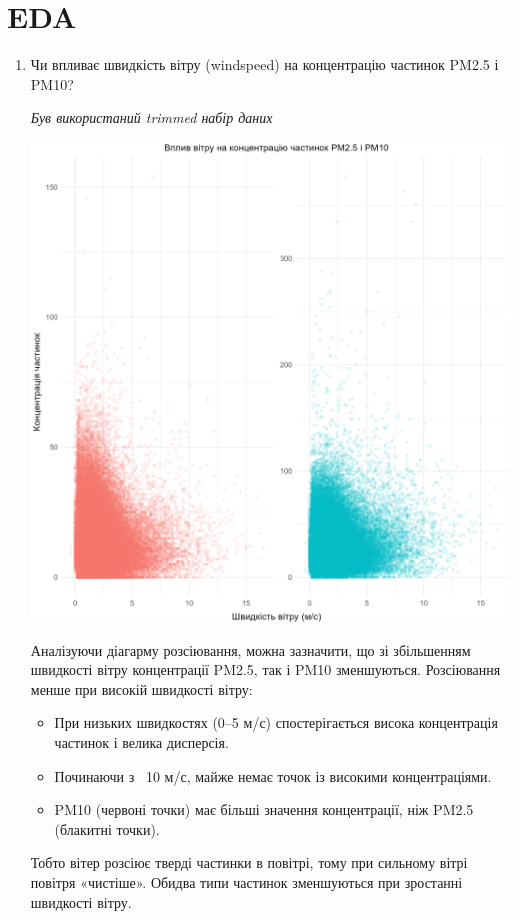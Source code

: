 \documentclass{article}
\begin{document}
\begin{enumerate}
    
\end{enumerate}

\pagebreak

\section{EDA}

\begin{enumerate}
    \item Чи впливає швидкість вітру (windspeed) на концентрацію частинок PM2.5 і PM10?
    
    \quad \textit{Був використаний trimmed набір даних}

    \includegraphics[width=6in]{plots/question1/wind_speed_vs_pm.png}

    Аналізуючи діагарму розсіювання, можна зазначити, що зі збільшенням швидкості вітру концентрації PM2.5, так і PM10 зменшуються.
    Розсіювання менше при високій швидкості вітру:
    \begin{itemize}
        \item При низьких швидкостях (0–5 м/с) спостерігається висока концентрація частинок і велика дисперсія.
        \item Починаючи з ~10 м/с, майже немає точок із високими концентраціями.
        \item PM10 (червоні точки) має більші значення концентрації, ніж PM2.5 (блакитні точки).
    \end{itemize}
    Тобто вітер розсіює тверді частинки в повітрі, тому при сильному вітрі повітря «чистіше». Обидва типи частинок зменшуються при зростанні швидкості вітру.


\end{enumerate}
\end{document}
